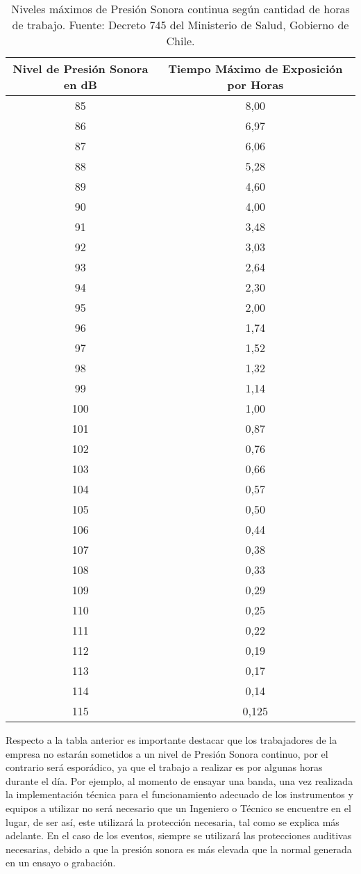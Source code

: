 \begin{table}[!h]
 \tiny
\centering
\begin{tabular}{|c|c|}
  \hline
  \textbf{Nivel de Presión Sonora en dB} & \textbf{Tiempo Máximo de Exposición por Horas}\\
  \hline
  85 & 8,00 \\ 
  86 & 6,97 \\
  87 & 6,06 \\
  88 & 5,28 \\
  89 & 4,60 \\
  90 & 4,00 \\
  91 & 3,48 \\
  92 & 3,03 \\
  93 & 2,64 \\
  94 & 2,30 \\
  95 & 2,00 \\
  96 & 1,74 \\
  97 & 1,52 \\
  98 & 1,32 \\
  99 & 1,14 \\
  100 & 1,00 \\
  101 & 0,87 \\
  102 & 0,76 \\
  103 & 0,66 \\
  104 & 0,57 \\
  105 & 0,50 \\
  106 & 0,44 \\
  107 & 0,38 \\
  108 & 0,33 \\
  109 & 0,29 \\
  110 & 0,25 \\
  111 & 0,22 \\
  112 & 0,19 \\
  113 & 0,17 \\
  114 & 0,14 \\
  115 & 0,125 \\
\hline
\end{tabular}
\caption{Niveles máximos de Presión Sonora continua según cantidad de horas de trabajo. Fuente: Decreto 745 del Ministerio de Salud, Gobierno de Chile.}
\end{table}

Respecto a la tabla anterior es importante destacar
que los trabajadores de la empresa no estarán
sometidos a un nivel de Presión Sonora continuo, por
el contrario será esporádico, ya que el trabajo
a realizar es por algunas horas durante el día. Por
ejemplo, al momento de ensayar una banda, una vez
realizada la implementación técnica para el funcionamiento
adecuado de los instrumentos y equipos a utilizar
no será necesario que un Ingeniero o Técnico se
encuentre en el lugar, de ser así, este utilizará
la protección necesaria, tal como se explica más adelante.
En el caso de los eventos, siempre se utilizará
las protecciones auditivas necesarias, debido a
que la presión sonora es más elevada que la normal
generada en un ensayo o grabación.\\


